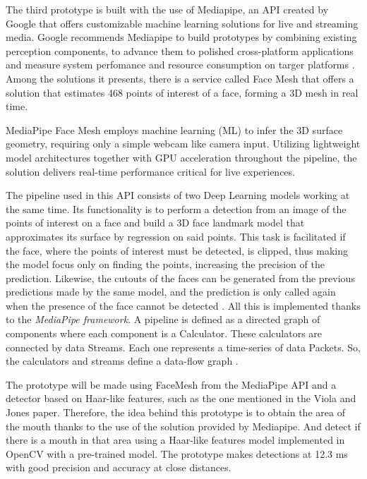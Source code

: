 The third prototype is built with the use of Mediapipe, an API created by Google that offers customizable machine learning solutions for live and streaming media.
Google recommends Mediapipe to build prototypes by combining existing perception components, to advance them to polished cross-platform applications and measure system perfomance and resource consumption on targer platforms \cite{mediapipe}. Among the solutions it presents, there is a service called Face Mesh that offers a solution that estimates 468 points of interest of a face, forming a 3D mesh in real time.

\vspace{-0.3cm}
MediaPipe Face Mesh employs machine learning (ML) to infer the 3D surface geometry, requiring only a simple webcam like camera input. Utilizing lightweight model architectures together with GPU acceleration throughout the pipeline, the solution delivers real-time performance critical for live experiences.

\vspace{-0.3cm}
The pipeline used in this API consists of two Deep Learning models working at the same time. Its functionality is to perform a detection from an image of the points of interest on a face and build a 3D face landmark model that approximates its surface by regression on said points. This task is facilitated if the face, where the points of interest must be detected, is clipped, thus making the model focus only on finding the points, increasing the precision of the prediction. Likewise, the cutouts of the faces can be generated from the previous predictions made by the same model, and the prediction is only called again when the presence of the face cannot be detected \cite{faceMesh}. All this is implemented thanks to the \textit{MediaPipe framework}. A pipeline is defined as a directed graph of components where each component is a Calculator. These calculators are connected by data Streams. Each one represents a time-series of data Packets. So, the calculators and streams define a data-flow graph \cite{mediapipe}.

\vspace{-0.3cm}
The prototype will be made using FaceMesh from the MediaPipe API and a detector based on Haar-like features, such as the one mentioned in the Viola and Jones paper. Therefore, the idea behind this prototype is to obtain the area of the mouth thanks to the use of the solution provided by Mediapipe. And detect if there is a mouth in that area using a Haar-like features model implemented in OpenCV with a pre-trained model. The prototype makes detections at 12.3 ms with good precision and accuracy at close distances. 


